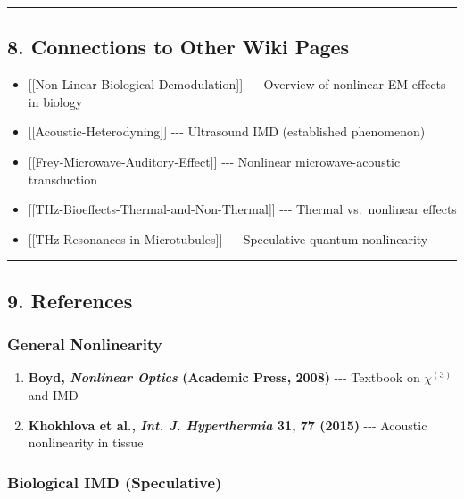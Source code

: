 \begin{center}\rule{0.5\linewidth}{0.5pt}\end{center}

\subsection{8. Connections to Other Wiki
Pages}\label{connections-to-other-wiki-pages}

\begin{itemize}
\tightlist
\item
  {[}{[}Non-Linear-Biological-Demodulation{]}{]} -\/-\/- Overview of
  nonlinear EM effects in biology
\item
  {[}{[}Acoustic-Heterodyning{]}{]} -\/-\/- Ultrasound IMD (established
  phenomenon)
\item
  {[}{[}Frey-Microwave-Auditory-Effect{]}{]} -\/-\/- Nonlinear
  microwave-acoustic transduction
\item
  {[}{[}THz-Bioeffects-Thermal-and-Non-Thermal{]}{]} -\/-\/- Thermal
  vs.~nonlinear effects
\item
  {[}{[}THz-Resonances-in-Microtubules{]}{]} -\/-\/- Speculative quantum
  nonlinearity
\end{itemize}

\begin{center}\rule{0.5\linewidth}{0.5pt}\end{center}

\subsection{9. References}\label{references}

\subsubsection{General Nonlinearity}\label{general-nonlinearity}

\begin{enumerate}
\def\labelenumi{\arabic{enumi}.}
\tightlist
\item
  \textbf{Boyd, \emph{Nonlinear Optics} (Academic Press, 2008)} -\/-\/-
  Textbook on \(\chi^{(3)}\) and IMD
\item
  \textbf{Khokhlova et al., \emph{Int. J. Hyperthermia} 31, 77 (2015)}
  -\/-\/- Acoustic nonlinearity in tissue
\end{enumerate}

\subsubsection{Biological IMD
(Speculative)}\label{biological-imd-speculative}

